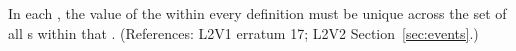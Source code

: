 In each \Event, the value of the   within every
\EventAssignment definition must be unique across the set of all
\EventAssignment{}s within that \Event.  (References: L2V1 erratum 17; L2V2
Section~\ref{sec:events}.)
